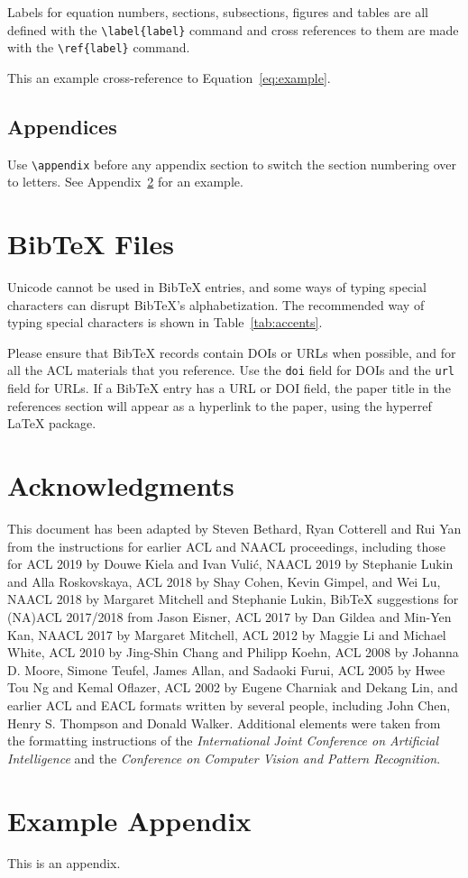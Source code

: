 \documentclass[11pt]{article}
\begin{document}
Labels for equation numbers, sections, subsections, figures and tables
are all defined with the \verb|\label{label}| command and cross references
to them are made with the \verb|\ref{label}| command.

This an example cross-reference to Equation~\ref{eq:example}.

\subsection{Appendices}

Use \verb|\appendix| before any appendix section to switch the section numbering over to letters. See Appendix~\ref{sec:appendix} for an example.

\section{Bib\TeX{} Files}
\label{sec:bibtex}

Unicode cannot be used in Bib\TeX{} entries, and some ways of typing special characters can disrupt Bib\TeX's alphabetization. The recommended way of typing special characters is shown in Table~\ref{tab:accents}.

Please ensure that Bib\TeX{} records contain DOIs or URLs when possible, and for all the ACL materials that you reference.
Use the \verb|doi| field for DOIs and the \verb|url| field for URLs.
If a Bib\TeX{} entry has a URL or DOI field, the paper title in the references section will appear as a hyperlink to the paper, using the hyperref \LaTeX{} package.

\section*{Acknowledgments}

This document has been adapted
by Steven Bethard, Ryan Cotterell and Rui Yan
from the instructions for earlier ACL and NAACL proceedings, including those for
ACL 2019 by Douwe Kiela and Ivan Vuli\'{c},
NAACL 2019 by Stephanie Lukin and Alla Roskovskaya,
ACL 2018 by Shay Cohen, Kevin Gimpel, and Wei Lu,
NAACL 2018 by Margaret Mitchell and Stephanie Lukin,
Bib\TeX{} suggestions for (NA)ACL 2017/2018 from Jason Eisner,
ACL 2017 by Dan Gildea and Min-Yen Kan,
NAACL 2017 by Margaret Mitchell,
ACL 2012 by Maggie Li and Michael White,
ACL 2010 by Jing-Shin Chang and Philipp Koehn,
ACL 2008 by Johanna D. Moore, Simone Teufel, James Allan, and Sadaoki Furui,
ACL 2005 by Hwee Tou Ng and Kemal Oflazer,
ACL 2002 by Eugene Charniak and Dekang Lin,
and earlier ACL and EACL formats written by several people, including
John Chen, Henry S. Thompson and Donald Walker.
Additional elements were taken from the formatting instructions of the \emph{International Joint Conference on Artificial Intelligence} and the \emph{Conference on Computer Vision and Pattern Recognition}.

%


\appendix

\section{Example Appendix}
\label{sec:appendix}

This is an appendix.
\end{document}
